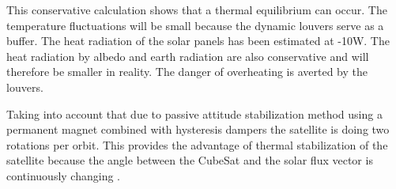 This conservative calculation shows that a thermal equilibrium can occur.
The temperature fluctuations will be small because the dynamic louvers serve
as a buffer. The heat radiation of the solar panels has been estimated at -10W.
The heat radiation by albedo and earth radiation are also conservative and will
therefore be smaller in reality. The danger of overheating is averted by the
louvers.

Taking into account that due to passive attitude stabilization method using a
permanent magnet combined with hysteresis dampers the satellite is doing two
rotations per orbit. This provides the advantage of thermal stabilization of the
satellite because the angle between the CubeSat and the solar flux vector is
continuously changing \cite{wiki_thermal}.
